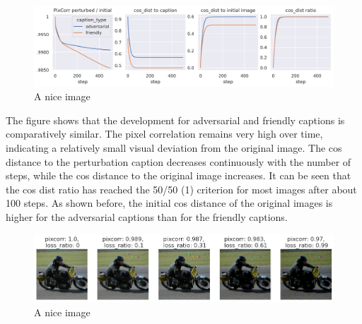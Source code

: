 \begin{figure}[ht]
    \centering
    \includegraphics[width=1\textwidth]{plots/advpert_validation_ic_loss_curves.png}
    \caption{A nice image}\label{fig:advpert_validation_ic_loss_curves}
\end{figure}

The figure shows that the development for adversarial and friendly captions is comparatively similar. The pixel correlation remains very high over time, indicating a relatively small visual deviation from the original image. The cos distance to the perturbation caption decreases continuously with the number of steps, while the cos distance to the original image increases. It can be seen that the cos dist ratio has reached the 50/50 (1) criterion for most images after about 100 steps. As shown before, the initial cos distance of the original images is higher for the adversarial captions than for the friendly captions.


\begin{figure}[ht]
    \centering
    \includegraphics[width=1\textwidth]{plots/advpert_ic_qual_validation_evolution.png}
    \caption{A nice image}\label{fig:advpert_ic_qual_validation_evolution}
\end{figure}

